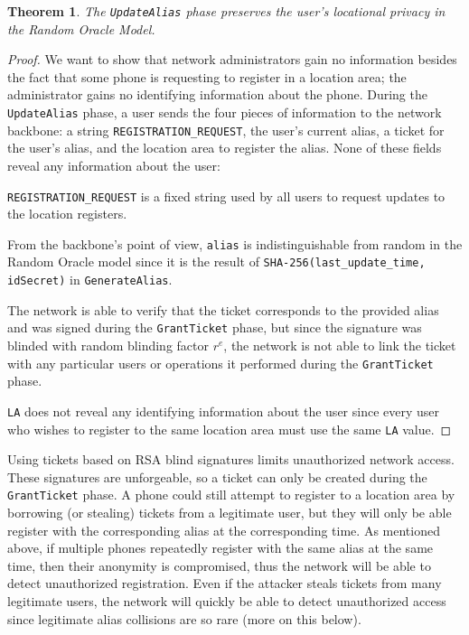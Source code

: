 \documentclass[11pt]{article}
\newtheorem{theorem}{Theorem}
\begin{document}
\begin{theorem}The \emph{\texttt{UpdateAlias}} phase preserves the user's locational privacy in the Random Oracle Model.
\end{theorem}

\begin{proof}
	We want to show that network administrators gain no information besides the fact that some phone is requesting to register in a location area; the administrator gains no identifying information about the phone. During the \texttt{UpdateAlias} phase, a user sends the four pieces of information to the network backbone: a string \texttt{REGISTRATION_REQUEST}, the user's current alias, a ticket for the user's alias, and the location area to register the alias. None of these fields reveal any information about the user:

\texttt{REGISTRATION_REQUEST} is a fixed string used by all users to request updates to the location registers.

From the backbone's point of view, \texttt{alias} is indistinguishable from random in the Random Oracle model since it is the result of \texttt{SHA-256(last_update_time, idSecret)} in \texttt{GenerateAlias}.

The network is able to verify that the ticket corresponds to the provided alias and was signed during the \texttt{GrantTicket} phase, but since the signature was blinded with random blinding factor $r^e$, the network is not able to link the ticket with any particular users or operations it performed during the \texttt{GrantTicket} phase.

\texttt{LA} does not reveal any identifying information about the user since every user who wishes to register to the same location area must use the same \texttt{LA} value.
\end{proof}

Using tickets based on RSA blind signatures limits unauthorized network access. These signatures are unforgeable, so a ticket can only be created during the \texttt{GrantTicket} phase. A phone could still attempt to register to a location area by borrowing (or stealing) tickets from a legitimate user, but they will only be able register with the corresponding alias at the corresponding time. As mentioned above, if multiple phones repeatedly register with the same alias at the same time, then their anonymity is compromised, thus the network will be able to detect unauthorized registration. Even if the attacker steals tickets from many legitimate users, the network will quickly be able to detect unauthorized access since legitimate alias collisions are so rare (more on this below).
\end{document}

